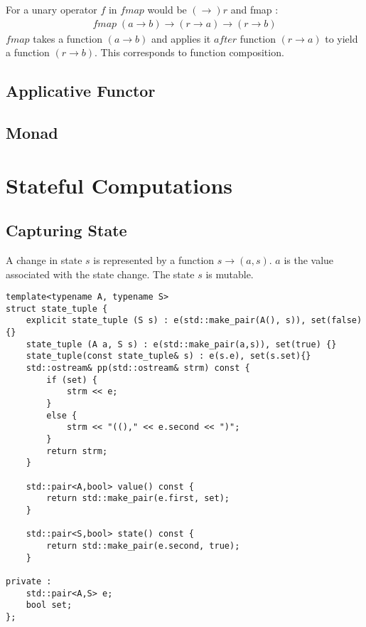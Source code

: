 \documentclass[12pt,fleqn]{article}
\begin{document}
For a unary operator $f$ in $fmap$  would be $(\rightarrow) r$ and fmap :
\begin{eqnarray*}
fmap \; (a \rightarrow b) \rightarrow (r \rightarrow a) \rightarrow (r \rightarrow b)
\end{eqnarray*}
$fmap$ takes a function $(a\rightarrow b)$ and applies it $after$ function $(r \rightarrow a)$ to yield a function $(r \rightarrow b)$.
This corresponds to function composition.

%
%
\subsection{Applicative Functor}
%
%


\subsection{Monad}






\section{Stateful Computations}


\subsection{Capturing State}
A change in state $s$ is represented by a function $s \rightarrow (a,s)$. 
$a$ is the value associated with the state change.
The state $s$ is mutable.

%
%
%
\begin{minipage}{\linewidth}
\begin{lstlisting}[caption=state tuple, label=state_tuple]
template<typename A, typename S>
struct state_tuple {
	explicit state_tuple (S s) : e(std::make_pair(A(), s)), set(false){}
	state_tuple (A a, S s) : e(std::make_pair(a,s)), set(true) {}
	state_tuple(const state_tuple& s) : e(s.e), set(s.set){}
	std::ostream& pp(std::ostream& strm) const {
		if (set) {
			strm << e;
		}
		else {
			strm << "(()," << e.second << ")";
		}
		return strm;
	}

	std::pair<A,bool> value() const {
		return std::make_pair(e.first, set);
	}

	std::pair<S,bool> state() const {
		return std::make_pair(e.second, true);
	}

private :	
	std::pair<A,S> e;
	bool set;
};
\end{lstlisting}
\end{minipage}
%
%
%
\end{document}
